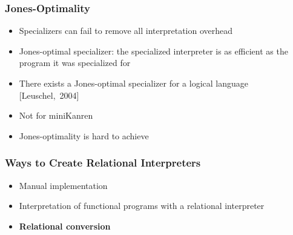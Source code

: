 \documentclass[xcolor=table]{beamer}
\begin{document}

\begin{frame}[fragile]
  \transwipe[direction=90]
  \frametitle{Jones-Optimality}
\begin{itemize}
	\item Specializers can fail to remove all interpretation overhead
	\item Jones-optimal specializer: the specialized interpreter is as efficient as the program it was specialized for
	\item There exists a Jones-optimal specializer for a logical language [Leuschel,~2004]
	\item Not for miniKanren
	\item Jones-optimality is hard to achieve
\end{itemize}
\end{frame}

\begin{frame}[fragile]
  \transwipe[direction=90]
  \frametitle{Ways to Create Relational Interpreters}
\begin{itemize}
	\item Manual implementation
	\item Interpretation of functional programs with a relational interpreter
	\item \textbf{Relational conversion}
\end{itemize}
\end{frame}
\end{document}

